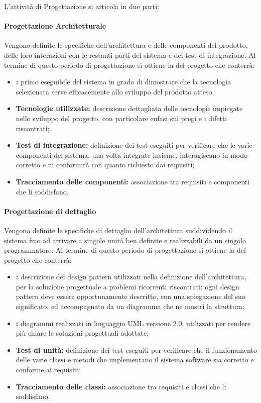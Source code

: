 \label{PeriodiProgettazione}
L'attività di Progettazione si articola in due parti: 
\paragraph*{Progettazione Architetturale} 
Vengono definite le specifiche dell'architettura e delle componenti del prodotto, delle loro interazioni con le restanti parti del sistema e dei test di integrazione. Al termine di questo periodo di progettazione si ottiene la \textit{} del progetto che conterrà: 
\begin{itemize}
	\item \textbf{:} primo eseguibile del sistema in grado di dimostrare che la tecnologia selezionata serve efficacemente allo sviluppo del prodotto atteso.
	\item \textbf{Tecnologie utilizzate:} descrizione dettagliata delle tecnologie impiegate nello sviluppo del progetto, con particolare enfasi sui pregi e i difetti riscontrati;
	\item \textbf{Test di integrazione:} definizione dei test eseguiti per verificare che le varie componenti del sistema, una volta integrate insieme, interagiscano in modo corretto e in conformità con quanto richiesto dai requisiti;
	\item \textbf{Tracciamento delle componenti:} associazione tra requisiti e componenti che li soddisfano.
\end{itemize}

\paragraph*{Progettazione di dettaglio}
Vengono definite le specifiche di dettaglio dell'architettura suddividendo il sistema fino ad arrivare a singole unità ben definite e realizzabili da un singolo programmatore. Al termine di questo periodo di progettazione si ottiene la \textit{} del progetto che conterrà: 
\begin{itemize}
	\item \textbf{:} descrizione dei design pattern utilizzati nella definizione dell'architettura, per la soluzione progettuale a problemi ricorrenti riscontrati; ogni design pattern deve essere opportunamente descritto, con una spiegazione del suo significato, ed accompagnato da un diagramma che ne mostri la struttura;
	\item \textbf{:} diagrammi realizzati in linguaggio UML versione 2.0, utilizzati per rendere più chiare le soluzioni progettuali adottate; 
	\item \textbf{Test di unità:} definizione dei test eseguiti per verificare che il funzionamento delle varie classi e metodi che implementano il sistema software sia corretto e conforme ai requisiti;
	\item \textbf{Tracciamento delle classi:} associazione tra requisiti e classi che li soddisfano.
\end{itemize}

